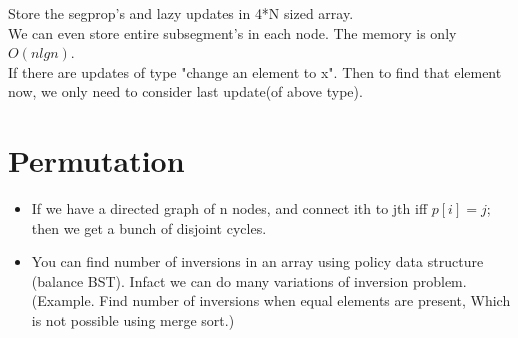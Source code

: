 \documentclass[../Notes.tex]{subfiles}
\begin{document}
Store the segprop's and lazy updates in 4*N sized array.\\

We can even store entire subsegment's in each node. The memory is only $O(nlgn)$.\\

If there are updates of type "change an element to x". Then to find that element now, we only need to consider last update(of above type).

\section{Permutation}
\begin{itemize}
	\item If we have a directed graph of n nodes, and connect ith to jth iff $p[i]=j$; then we get a bunch of disjoint cycles.
	\item You can find number of inversions in an array using policy data structure (balance BST). Infact we can do many variations of inversion problem. (Example. Find number of inversions when equal elements are present, Which is not possible using merge sort.) 
\end{itemize}
\end{document}
